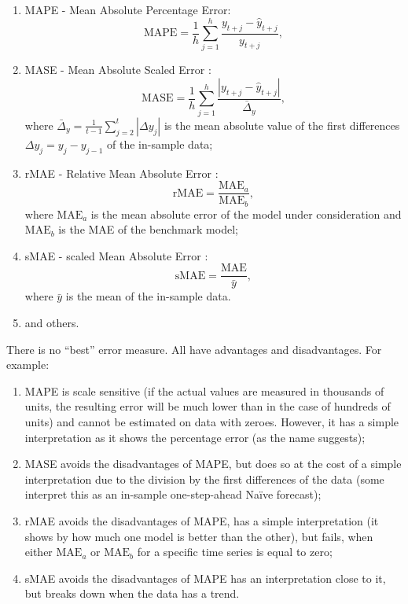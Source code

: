 \documentclass[
]{book}
\providecommand{\tightlist}{%
  \setlength{\itemsep}{0pt}\setlength{\parskip}{0pt}}
\theoremstyle{definition}
\theoremstyle{definition}
\theoremstyle{definition}
\theoremstyle{definition}
\theoremstyle{remark}
\begin{document}
\begin{enumerate}
\def\labelenumi{\arabic{enumi}.}
\tightlist
\item
  MAPE - Mean Absolute Percentage Error:
  \begin{equation}
   \mathrm{MAPE} = \frac{1}{h} \sum_{j=1}^h \frac{y_{t+j} - \hat{y}_{t+j}}{y_{t+j}},
   \label{eq:MAPE}
  \end{equation}
\item
  MASE - Mean Absolute Scaled Error \citep{Hyndman2006}:
  \begin{equation}
   \mathrm{MASE} = \frac{1}{h} \sum_{j=1}^h \frac{|y_{t+j} - \hat{y}_{t+j}|}{\bar{\Delta}_y},
   \label{eq:MASE}
  \end{equation}
  where \(\bar{\Delta}_y = \frac{1}{t-1}\sum_{j=2}^t |\Delta y_{j}|\) is the mean absolute value of the first differences \(\Delta y_{j}=y_j-y_{j-1}\) of the in-sample data;
\item
  rMAE - Relative Mean Absolute Error \citep{Davydenko2013}:
  \begin{equation}
   \mathrm{rMAE} = \frac{\mathrm{MAE}_a}{\mathrm{MAE}_b},
   \label{eq:rMAE}
  \end{equation}
  where \(\mathrm{MAE}_a\) is the mean absolute error of the model under consideration and \(\mathrm{MAE}_b\) is the MAE of the benchmark model;
\item
  sMAE - scaled Mean Absolute Error \citep{Petropoulos2015}:
  \begin{equation}
   \mathrm{sMAE} = \frac{\mathrm{MAE}}{\bar{y}},
   \label{eq:sMAE}
  \end{equation}
  where \(\bar{y}\) is the mean of the in-sample data.
\item
  and others.
\end{enumerate}

There is no ``best'' error measure. All have advantages and disadvantages. For example:

\begin{enumerate}
\def\labelenumi{\arabic{enumi}.}
\tightlist
\item
  MAPE is scale sensitive (if the actual values are measured in thousands of units, the resulting error will be much lower than in the case of hundreds of units) and cannot be estimated on data with zeroes. However, it has a simple interpretation as it shows the percentage error (as the name suggests);
\item
  MASE avoids the disadvantages of MAPE, but does so at the cost of a simple interpretation due to the division by the first differences of the data (some interpret this as an in-sample one-step-ahead Naïve forecast);
\item
  rMAE avoids the disadvantages of MAPE, has a simple interpretation (it shows by how much one model is better than the other), but fails, when either \(\mathrm{MAE}_a\) or \(\mathrm{MAE}_b\) for a specific time series is equal to zero;
\item
  sMAE avoids the disadvantages of MAPE has an interpretation close to it, but breaks down when the data has a trend.
\end{enumerate}
\end{document}

